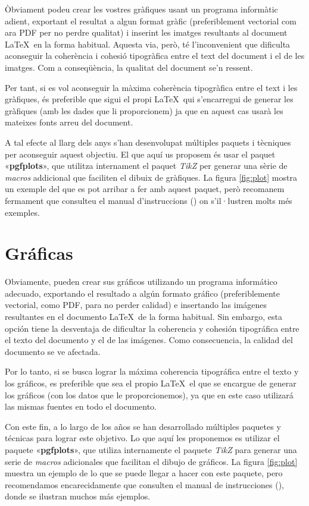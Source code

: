   Òbviament podeu crear les vostres gràfiques usant un programa informàtic adient, exportant el resultat a algun format gràfic (preferiblement vectorial com ara PDF per no perdre qualitat) i inserint les imatges resultants al document \LaTeX\ en la forma habitual. Aquesta via, però, té l'inconvenient que dificulta aconseguir la coherència i cohesió tipogràfica entre el text del document i el de les imatges. Com a conseqüència, la qualitat del document se'n ressent.
  
  Per tant, si es vol aconseguir la màxima coherència tipogràfica entre el text i les gràfiques, és preferible que sigui el propi \LaTeX\ qui s'encarregui de generar les gràfiques (amb les dades que li proporcionem) ja que en aquest cas usarà les mateixes fonts arreu del document.
  
  A tal efecte al llarg dels anys s'han desenvolupat múltiples paquets i tècniques per aconseguir aquest objectiu. El que aquí us proposem és usar el paquet «\textbf{pgfplots}», que utilitza internament el paquet \textit{TikZ} per generar una sèrie de \textit{macros} addicional que faciliten el dibuix de gràfiques. La figura \ref{fig:plot} mostra un exemple del que es pot arribar a fer amb aquest paquet, però recomanem fermament que consulteu el manual d'instruccions (\cite{pgfplots}) on s'il·lustren molts més exemples.
\or
  \section{Gráficas}
  
  Obviamente, pueden crear sus gráficos utilizando un programa informático adecuado, exportando el resultado a algún formato gráfico (preferiblemente vectorial, como PDF, para no perder calidad) e insertando las imágenes resultantes en el documento \LaTeX\ de la forma habitual. Sin embargo, esta opción tiene la desventaja de dificultar la coherencia y cohesión tipográfica entre el texto del documento y el de las imágenes. Como consecuencia, la calidad del documento se ve afectada.
  
  Por lo tanto, si se busca lograr la máxima coherencia tipográfica entre el texto y los gráficos, es preferible que sea el propio \LaTeX\ el que se encargue de generar los gráficos (con los datos que le proporcionemos), ya que en este caso utilizará las mismas fuentes en todo el documento.
  
  Con este fin, a lo largo de los años se han desarrollado múltiples paquetes y técnicas para lograr este objetivo. Lo que aquí les proponemos es utilizar el paquete «\textbf{pgfplots}», que utiliza internamente el paquete \textit{TikZ} para generar una serie de \textit{macros} adicionales que facilitan el dibujo de gráficos. La figura \ref{fig:plot} muestra un ejemplo de lo que se puede llegar a hacer con este paquete, pero recomendamos encarecidamente que consulten el manual de instrucciones (\cite{pgfplots}), donde se ilustran muchos más ejemplos.
\else
